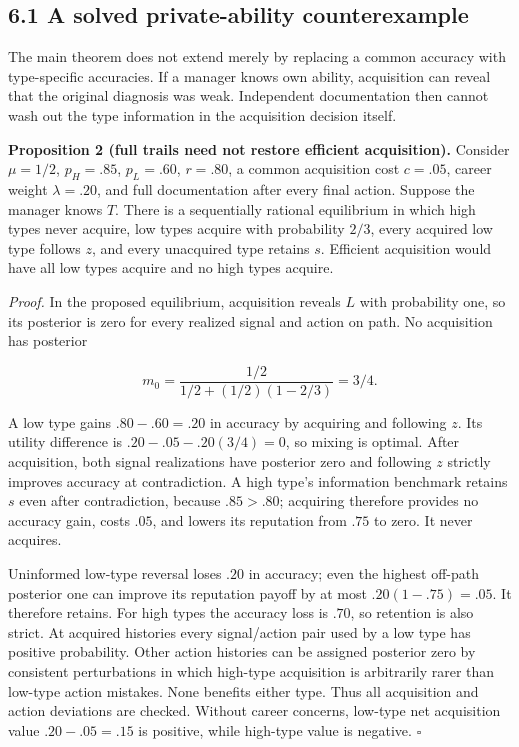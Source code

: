 \documentclass[
  11pt,
]{article}
\begin{document}
\subsection{6.1 A solved private-ability
counterexample}\label{a-solved-private-ability-counterexample}

The main theorem does not extend merely by replacing a common accuracy
with type-specific accuracies. If a manager knows own ability,
acquisition can reveal that the original diagnosis was weak. Independent
documentation then cannot wash out the type information in the
acquisition decision itself.

\textbf{Proposition 2 (full trails need not restore efficient
acquisition).} Consider \(\mu=1/2\), \(p_H=.85\), \(p_L=.60\),
\(r=.80\), a common acquisition cost \(c=.05\), career weight
\(\lambda=.20\), and full documentation after every final action.
Suppose the manager knows \(T\). There is a sequentially rational
equilibrium in which high types never acquire, low types acquire with
probability \(2/3\), every acquired low type follows \(z\), and every
unacquired type retains \(s\). Efficient acquisition would have all low
types acquire and no high types acquire.

\emph{Proof.} In the proposed equilibrium, acquisition reveals \(L\)
with probability one, so its posterior is zero for every realized signal
and action on path. No acquisition has posterior

\[m_0=\frac{1/2}{1/2+(1/2)(1-2/3)}=3/4.\]

A low type gains \(.80-.60=.20\) in accuracy by acquiring and following
\(z\). Its utility difference is \(.20-.05-.20(3/4)=0\), so mixing is
optimal. After acquisition, both signal realizations have posterior zero
and following \(z\) strictly improves accuracy at contradiction. A high
type's information benchmark retains \(s\) even after contradiction,
because \(.85>.80\); acquiring therefore provides no accuracy gain,
costs \(.05\), and lowers its reputation from \(.75\) to zero. It never
acquires.

Uninformed low-type reversal loses \(.20\) in accuracy; even the highest
off-path posterior one can improve its reputation payoff by at most
\(.20(1-.75)=.05\). It therefore retains. For high types the accuracy
loss is \(.70\), so retention is also strict. At acquired histories
every signal/action pair used by a low type has positive probability.
Other action histories can be assigned posterior zero by consistent
perturbations in which high-type acquisition is arbitrarily rarer than
low-type action mistakes. None benefits either type. Thus all
acquisition and action deviations are checked. Without career concerns,
low-type net acquisition value \(.20-.05=.15\) is positive, while
high-type value is negative. \(\square\)
\end{document}
